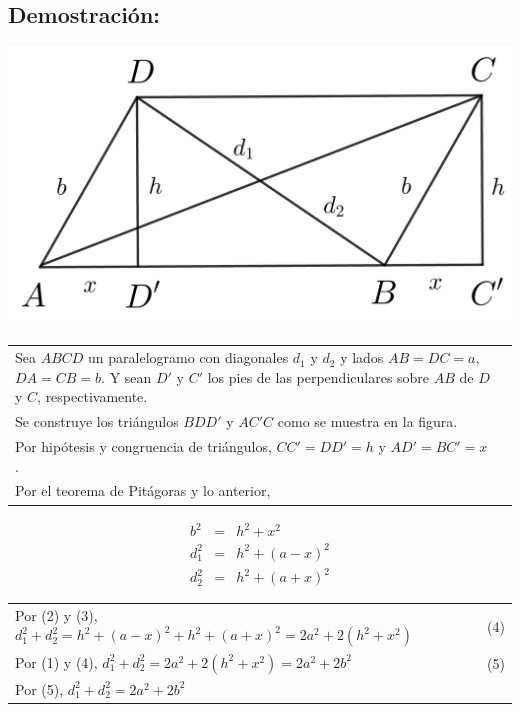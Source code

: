 \documentclass[12pt,a4paper]{article}
\begin{document}
\subsection*{Demostración:}
\begin{center}
\includegraphics[scale=0.7]{paralelogramo.png} 
\end{center}
\begin{tabular}{p{15.9 cm} p{1cm}}
Sea $ABCD$ un paralelogramo con diagonales $d_1$ y $d_2$ y lados $AB=DC=a$, $DA=CB=b$. Y sean $D'$ y $C'$ los pies de las perpendiculares sobre $AB$ de $D$ y $C$, respectivamente.
\\Se construye los triángulos $BDD'$ y $AC'C$ como se muestra en la figura.
\\Por hipótesis y congruencia de triángulos, $CC'=DD'=h$ y $AD'=BC'=x$.
\\Por el teorema de Pitágoras y lo anterior, 
\end{tabular}
\begin{eqnarray}
b^2&=& h^2 +x^2 \\
d_1^2 &=&h^2 +(a-x)^2\\
d_2^2&=&h^2 +(a+x)^2
\end{eqnarray}
\begin{tabular}{p{15.9 cm} p{1cm}}
Por (2) y (3), $d_1^2 +d_2^2=h^2 +(a-x)^2+h^2 +(a+x)^2=2a^2+2(h^2+x^2)$ &(4)
\\Por (1) y (4), $d_1^2 +d_2^2=2a^2+2(h^2+x^2)=2a^2+2b^2$ & (5)
\\Por (5), $d_1^2 +d_2^2=2a^2+2b^2$
\end{tabular}
\end{document}
